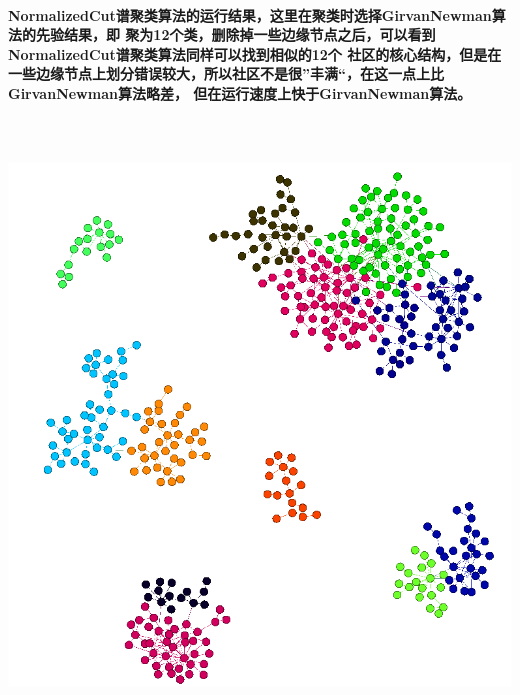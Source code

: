 \documentclass{ctexart}
\begin{document}
    \paragraph{
        NormalizedCut谱聚类算法的运行结果，这里在聚类时选择GirvanNewman算法的先验结果，即
        聚为12个类，删除掉一些边缘节点之后，可以看到NormalizedCut谱聚类算法同样可以找到相似的12个
        社区的核心结构，但是在一些边缘节点上划分错误较大，所以社区不是很”丰满“，在这一点上比GirvanNewman算法略差，
        但在运行速度上快于GirvanNewman算法。
    }
    \begin{center}
        \includegraphics[height= 16cm] {NCCut.png}
    \end{center}
\end{document}
